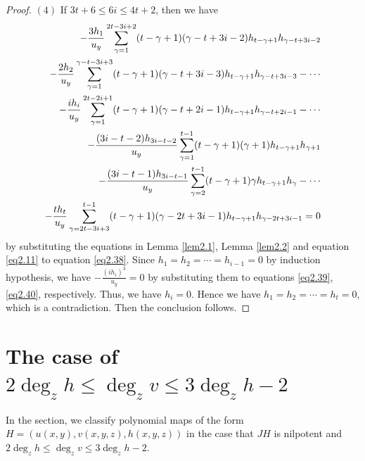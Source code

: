 \documentclass[12pt, twoside, leqno]{article}
\theoremstyle{definition}
\numberwithin{equation}{section}
\begin{document}
\begin{proof}
$(4)$ If $3t+6\leq 6i\leq 4t+2$, then we have
\begin{equation}\label{eq2.40}
\begin{split}
-\frac{3h_{1}}{u_{y}}\sum_{\gamma=1}^{2t-3i+2}(t-\gamma+1)(\gamma-t+3i-2)h_{t-\gamma+1}h_{\gamma-t+3i-2}\notag\\-\frac{2h_{2}}{u_{y}}\sum_{\gamma=1}^{\gamma-t-3i+3}(t-\gamma+1)(\gamma-t+3i-3)h_{t-\gamma+1}h_{\gamma-t+3i-3}-\cdots\\-\frac{ih_{i}}{u_{y}}\sum_{\gamma=1}^{2t-2i+1}(t-\gamma+1)(\gamma-t+2i-1)h_{t-\gamma+1}h_{\gamma-t+2i-1}-\cdots\\
	 -\frac{(3i-t-2)h_{3i-t-2}}{u_{y}}\sum_{\gamma=1}^{t-1}(t-\gamma+1)(\gamma+1)h_{t-\gamma+1}h_{\gamma+1}\\-\frac{(3i-t-1)h_{3i-t-1}}{u_{y}}\sum_{\gamma=2}^{t-1}(t-\gamma+1)\gamma h_{t-\gamma+1}h_{\gamma}
	 -\cdots\\-\frac{th_{t}}{u_{y}}\sum_{\gamma=2t-3i+3}^{t-1}(t-\gamma+1)(\gamma-2t+3i-1)h_{t-\gamma+1}h_{\gamma-2t+3i-1}=0
\end{split}
\end{equation}
by substituting the equations in Lemma \ref{lem2.1}, Lemma \ref{lem2.2} and equation \eqref{eq2.11} to equation \eqref{eq2.38}. Since $h_1=h_2=\cdots=h_{i-1}=0$ by induction hypothesis, we have $-\frac{(ih_{i})^{3}}{u_{y}}=0$ by substituting them to equations \eqref{eq2.39}, \eqref{eq2.40}, respectively. Thus, we have $h_i=0$. Hence we have $h_1=h_2=\cdots=h_t=0$, which is a contradiction. Then the conclusion follows.
\end{proof}

\section{The case of $2\deg_zh\leq\deg_zv\leq 3\deg_zh-2$}

In the section, we classify polynomial maps of the form
$H=(u(x,y),v(x,y,z),\allowbreak h(x,y,z))$ in the case that $JH$ is
nilpotent and $2\deg_zh\leq\deg_zv\leq 3\deg_zh-2$.
\end{document}
